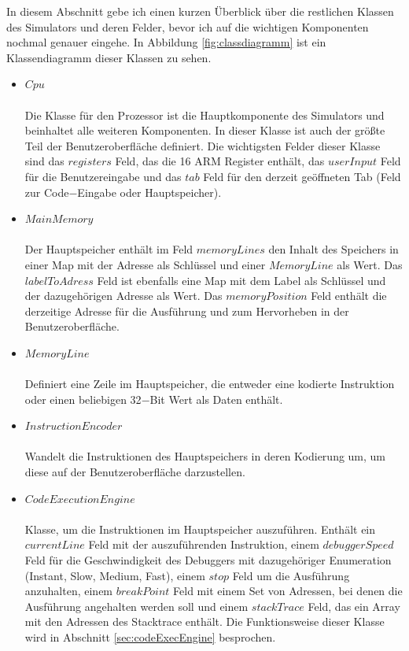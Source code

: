 \documentclass[a4paper, 11pt, onecolumn]{article}
\begin{document}
In diesem Abschnitt gebe ich einen kurzen Überblick über die restlichen Klassen des Simulators und deren Felder, bevor ich auf die wichtigen Komponenten nochmal genauer eingehe. In Abbildung \ref{fig:classdiagramm} ist ein Klassendiagramm dieser Klassen zu sehen.

\begin{itemize}
\item $Cpu$\\ \\Die Klasse für den Prozessor ist die Hauptkomponente des Simulators und beinhaltet alle weiteren Komponenten. In dieser Klasse ist auch der größte Teil der Benutzeroberfläche definiert. Die wichtigsten Felder dieser Klasse sind das $registers$ Feld, das die 16 ARM Register enthält, das $userInput$ Feld für die Benutzereingabe und das $tab$ Feld für den derzeit geöffneten Tab (Feld zur Code$-$Eingabe oder Hauptspeicher).
\item $MainMemory$\\ \\Der Hauptspeicher enthält im Feld $memoryLines$ den Inhalt des Speichers in einer Map mit der Adresse als Schlüssel und einer $MemoryLine$ als Wert. Das $labelToAdress$ Feld ist ebenfalls eine Map mit dem Label als Schlüssel und der dazugehörigen Adresse als Wert. Das $memoryPosition$ Feld enthält die derzeitige Adresse für die Ausführung und zum Hervorheben in der Benutzeroberfläche.
\item $MemoryLine$\\ \\Definiert eine Zeile im Hauptspeicher, die entweder eine kodierte Instruktion oder einen beliebigen 32$-$Bit Wert als Daten enthält.
\item $InstructionEncoder$\\ \\Wandelt die Instruktionen des Hauptspeichers in deren Kodierung um, um diese auf der Benutzeroberfläche darzustellen.
\item $CodeExecutionEngine$\\ \\Klasse, um die Instruktionen im Hauptspeicher auszuführen. Enthält ein $currentLine$ Feld mit der auszuführenden Instruktion, einem $debuggerSpeed$ Feld für die Geschwindigkeit des Debuggers mit dazugehöriger Enumeration (Instant, Slow, Medium, Fast), einem $stop$ Feld um die Ausführung anzuhalten, einem $breakPoint$ Feld mit einem Set von Adressen, bei denen die Ausführung angehalten werden soll und einem $stackTrace$ Feld, das ein Array mit den Adressen des Stacktrace enthält. Die Funktionsweise dieser Klasse wird in Abschnitt \ref{sec:codeExecEngine} besprochen.

\end{itemize}
\end{document}
